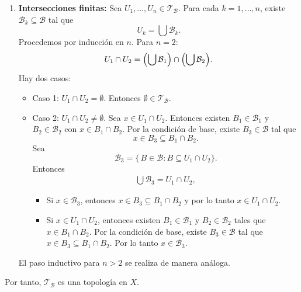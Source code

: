 \begin{enumerate}[label=\arabic*.]
  \item \textbf{Intersecciones finitas:} Sea $U_1,\dots,U_n\in\mathcal T_{\mathcal{B}}$. Para cada $k=1,\dots, n$, existe $\mathcal{B}_k\subseteq\mathcal{B}$ tal que
    \[
      U_k = \bigcup \mathcal{B}_k.
    \]
    Procedemos por inducción en $n$. Para $n=2$:
    \[
      U_1\cap U_2
      = \Bigl(\bigcup \mathcal{B}_1\Bigr)\cap \Bigl(\bigcup \mathcal{B}_2\Bigr).
    \]
    Hay dos casos:
    \begin{itemize}
      \item Caso 1: $U_1\cap U_2=\emptyset$. Entonces $\emptyset\in\mathcal T_{\mathcal{B}}$.
      \item Caso 2: $U_1\cap U_2\neq\emptyset$. Sea $x\in U_1\cap U_2$. Entonces existen $B_1\in\mathcal{B}_1$ y $B_2\in\mathcal{B}_2$ con $x\in B_1\cap B_2$. Por la condición de base, existe $B_3\in\mathcal{B}$ tal que
      \[
        x\in B_3\subseteq B_1\cap B_2.
      \]
      Sea 
      \[
        \mathcal{B}_3 = \{\,B\in\mathcal{B} : B\subseteq U_1\cap U_2\}.
      \]
      Entonces
      \begin{align*}
        \bigcup \mathcal{B}_3 = U_1\cap U_2,
      \end{align*}
      \begin{itemize}
        \item[$\supseteq$] Si $x \in \mathcal {B}_3$, entonces $x\in B_3\subseteq B_1\cap B_2$ y por lo tanto $x\in U_1\cap U_2$.
        \item[$\subseteq$] Si $x\in U_1\cap U_2$, entonces existen $B_1\in\mathcal{B}_1$ y $B_2\in\mathcal{B}_2$ tales que $x\in B_1\cap B_2$. Por la condición de base, existe $B_3\in\mathcal{B}$ tal que $x\in B_3\subseteq B_1\cap B_2$. Por lo tanto $x\in \mathcal{B}_3$.
      \end{itemize}
    \end{itemize}
    El paso inductivo para $n>2$ se realiza de manera análoga.
\end{enumerate}

Por tanto, $\mathcal T_{\mathcal{B}}$ es una topología en $X$.